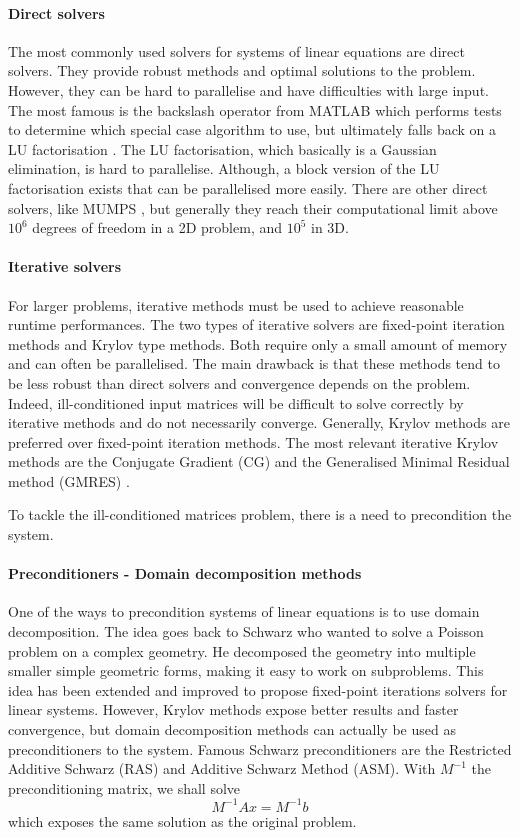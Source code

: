 \paragraph{Direct solvers}
The most commonly used solvers for systems of linear equations are direct solvers.
They provide robust methods and optimal solutions to the problem.
However, they can be hard to parallelise and have difficulties with large input.
The most famous is the backslash operator from MATLAB which performs tests to determine which special case algorithm to use, but ultimately falls back on a LU factorisation \cite{mldivide_matlab}.
The LU factorisation, which basically is a Gaussian elimination, is hard to parallelise.
Although, a block version of the LU factorisation exists that can be parallelised more easily.
There are  other direct solvers, like MUMPS \cite{MUMPS_2001}, but generally they reach their computational limit above \(10^6\) degrees of freedom in a 2D problem, and \(10^5\) in 3D.

\paragraph{Iterative solvers}
For larger problems, iterative methods must be used to achieve reasonable runtime performances.
The two types of iterative solvers are fixed-point iteration methods and Krylov type methods.
Both require only a small amount of memory and can often be parallelised.
The main drawback is that these methods tend to be less robust than direct solvers and convergence depends on the problem.
Indeed, ill-conditioned input matrices will be difficult to solve correctly by iterative methods and do not necessarily converge.
Generally, Krylov methods are preferred over fixed-point iteration methods.
The most relevant iterative Krylov methods are the Conjugate Gradient (CG) and the Generalised Minimal Residual method (GMRES) \cite{saad_gmres_1986}.

To tackle the ill-conditioned matrices problem, there is a need to precondition the system.


\paragraph{Preconditioners - Domain decomposition methods}
One of the ways to precondition systems of linear equations is to use domain decomposition.
The idea goes back to Schwarz who wanted to solve a Poisson problem on a complex geometry.
He decomposed the geometry into multiple smaller simple geometric forms, making it easy to work on subproblems.
This idea has been extended and improved to propose fixed-point iterations solvers for linear systems.
However, Krylov methods expose better results and faster convergence, but domain decomposition methods can actually be used as preconditioners to the system.
Famous Schwarz preconditioners are the Restricted Additive Schwarz (RAS) and Additive Schwarz Method (ASM).
With \(M^{-1}\) the preconditioning matrix, we shall solve
\[M^{-1}Ax = M^{-1}b\]
which exposes the same solution as the original problem.

